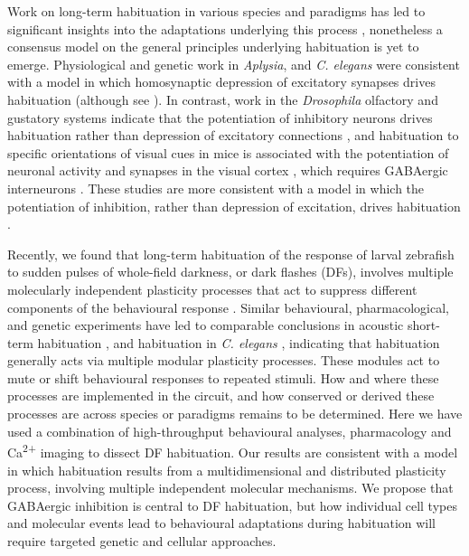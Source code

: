 \documentclass[9pt,lineno]{RandlettLab_elife}
\begin{document}
Work on long-term habituation in various species and paradigms has led to significant insights into the adaptations underlying this process \citep{Cooke2020-mz, McDiarmid2019-mh}, nonetheless a consensus model on the general principles underlying habituation is yet to emerge.  Physiological and genetic work in \emph{Aplysia}, and \emph{C. elegans} were consistent with a model in which homosynaptic depression of excitatory synapses drives habituation \citep{Bailey1983-ei, Rose2003-dl} (although see \citep{Glanzman2009-tz}). In contrast, work in the \emph{Drosophila} olfactory and gustatory systems indicate that the potentiation of inhibitory neurons drives habituation rather than depression of excitatory connections \citep{Das2011-gd, Paranjpe2012-ce, Trisal2022-pa},  and habituation to specific orientations of visual cues in mice is associated with the potentiation of neuronal activity and synapses in the visual cortex \citep{Cooke2015-qs}, which requires GABAergic interneurons \citep{Kaplan2016-qk, Hayden2021-ca}. These studies are more consistent with a model in which the potentiation of inhibition, rather than depression of excitation, drives habituation \citep{Cooke2020-mz}. 

Recently, we found that long-term habituation of the response of larval zebrafish to sudden pulses of whole-field darkness, or dark flashes (DFs), involves multiple molecularly independent plasticity processes that act to suppress different components of the behavioural response \citep{Randlett2019-fi}. Similar behavioural, pharmacological, and genetic experiments have led to comparable conclusions in acoustic short-term habituation \citep{Nelson2022-qr}, and habituation in \emph{C. elegans} \citep{McDiarmid2019-lo, McDiarmid2019-mh}, indicating that habituation generally acts via multiple modular plasticity processes. These modules act to mute or shift behavioural responses to repeated stimuli. How and where these processes are implemented in the circuit, and how conserved or derived these processes are across species or paradigms remains to be determined. Here we have used a combination of high-throughput behavioural analyses, pharmacology and Ca\textsuperscript{2+} imaging to dissect DF habituation. Our results are consistent with a model in which habituation results from a multidimensional and distributed plasticity process, involving multiple independent molecular mechanisms. We propose that GABAergic inhibition is central to DF habituation, but how individual cell types and molecular events lead to behavioural adaptations during habituation will require targeted genetic and cellular approaches.   
\end{document}
